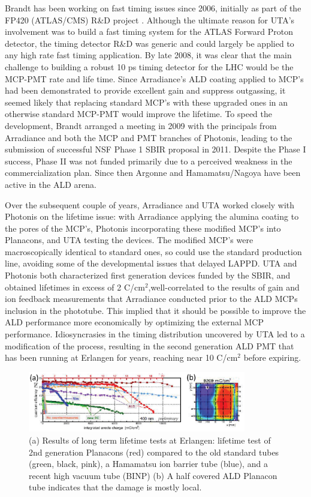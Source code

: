 Brandt has been working on fast timing issues since 2006, initially as part of the FP420 (ATLAS/CMS) R\&D project \cite{FP420}. Although the ultimate reason for UTA's involvement was to build a fast timing system for the ATLAS Forward Proton detector, the timing detector R\&D was generic and could largely be applied to any high rate fast timing application. By late 2008, it was clear that the main challenge to building a robust 10 ps timing detector for the LHC would be the MCP-PMT rate and life time. Since Arradiance's ALD coating applied to MCP's had been demonstrated to provide excellent gain and  suppress outgassing, it seemed likely that replacing standard MCP's with these upgraded ones in an otherwise standard MCP-PMT would improve the lifetime. To speed the development,  Brandt arranged a meeting in 2009 with the principals from Arradiance and both the MCP and PMT branches of Photonis, leading  to the submission of  successful NSF Phase 1 SBIR proposal in 2011. Despite the Phase I success, Phase II was not funded primarily due to a perceived weakness in the commercialization plan.  Since then Argonne and Hamamatsu/Nagoya have been active in the ALD arena.

Over the subsequent couple of years, Arradiance and UTA worked closely with Photonis on the lifetime issue: with Arradiance applying the alumina coating to the pores of the MCP's, Photonis incorporating these modified MCP's into Planacons, and UTA testing the devices. The modified MCP's were macroscopically identical to standard ones, so could use the standard production line, avoiding some of the developmental issues that delayed LAPPD. UTA and Photonis both characterized first generation devices funded by the SBIR, and obtained lifetimes in excess of 2 C/cm$^{2}$,well-correlated to the results of gain and ion feedback measurements that Arradiance conducted prior to the ALD MCPs inclusion in the phototube. This implied that it should be possible to improve the ALD performance more economically by optimizing the external MCP performance. Idiosyncrasies in the timing distribution uncovered by UTA led to a modification of the process, resulting in the second generation ALD PMT that has been running at Erlangen for years, reaching near 10 C/cm$^{2}$ before expiring.  

\begin{figure}[htb]
\centering
\includegraphics[width=0.85\textwidth]{images/figure2Brandt.eps}
\caption[]{(a)  Results of long term lifetime tests at Erlangen: lifetime test of 2nd generation Planacons (red) compared to the old  standard tubes (green, black, pink), a Hamamatsu ion barrier tube (blue), and a recent high vacuum tube (BINP)  (b) A half covered ALD Planacon tube indicates that the damage is mostly local.}
\label{fig:Erlangen}
\end{figure}

